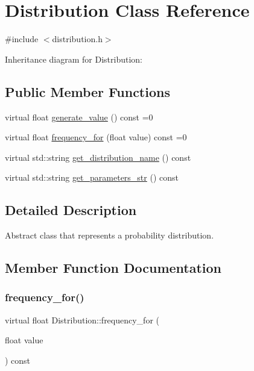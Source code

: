 \hypertarget{classDistribution}{}\section{Distribution Class Reference}
\label{classDistribution}


{\ttfamily \#include $<$distribution.\+h$>$}



Inheritance diagram for Distribution\+:
\subsection*{Public Member Functions}
\begin{DoxyCompactItemize}
\item 
virtual float \hyperlink{classDistribution_aa1ea89994ac123f003b8b8f5fe6fad40}{generate\+\_\+value} () const =0
\item 
virtual float \hyperlink{classDistribution_a0778c93fb686dd1abe2830e1c7e564a6}{frequency\+\_\+for} (float value) const =0
\item 
virtual std\+::string \hyperlink{classDistribution_a478a0c7b72d3ad266a2b6f1b9ed20fe9}{get\+\_\+distribution\+\_\+name} () const
\item 
virtual std\+::string \hyperlink{classDistribution_a716b7df9facb6bb016f46ac130297f9c}{get\+\_\+parameters\+\_\+str} () const
\end{DoxyCompactItemize}


\subsection{Detailed Description}
Abstract class that represents a probability distribution. 

\subsection{Member Function Documentation}
\mbox{\label{classDistribution_a0778c93fb686dd1abe2830e1c7e564a6}} 
\subsubsection{\texorpdfstring{frequency\+\_\+for()}{frequency\_for()}}
{\footnotesize\ttfamily virtual float Distribution\+::frequency\+\_\+for (\begin{DoxyParamCaption}\item[{float}]{value }\end{DoxyParamCaption}) const\hspace{0.3cm}{\ttfamily [pure virtual]}}

